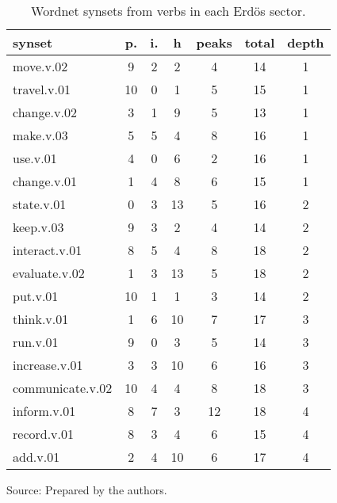 \begin{table}[h!]
\begin{center}
\caption{Wordnet synsets from verbs in each Erd\"os sector.}
	\label{tab:wnvh}
\begin{tabular}{| l || c | c | c || c | c | c |}\hline
{\bf synset} & {\bf p.} & {\bf i.} & {\bf h} & {\bf peaks} & {\bf total} & {\bf depth} \\\hline\hline
move.v.02 & 9  & 2  & 2  & 4  & 14  & 1 \\
travel.v.01 & 10  & 0  & 1  & 5  & 15  & 1 \\
change.v.02 & 3  & 1  & 9  & 5  & 13  & 1 \\
make.v.03 & 5  & 5  & 4  & 8  & 16  & 1 \\
use.v.01 & 4  & 0  & 6  & 2  & 16  & 1 \\
change.v.01 & 1  & 4  & 8  & 6  & 15  & 1 \\\hline
state.v.01 & 0  & 3  & 13  & 5  & 16  & 2 \\
keep.v.03 & 9  & 3  & 2  & 4  & 14  & 2 \\
interact.v.01 & 8  & 5  & 4  & 8  & 18  & 2 \\
evaluate.v.02 & 1  & 3  & 13  & 5  & 18  & 2 \\
put.v.01 & 10  & 1  & 1  & 3  & 14  & 2 \\\hline
think.v.01 & 1  & 6  & 10  & 7  & 17  & 3 \\
run.v.01 & 9  & 0  & 3  & 5  & 14  & 3 \\
increase.v.01 & 3  & 3  & 10  & 6  & 16  & 3 \\
communicate.v.02 & 10  & 4  & 4  & 8  & 18  & 3 \\\hline
inform.v.01 & 8  & 7  & 3  & 12  & 18  & 4 \\
record.v.01 & 8  & 3  & 4  & 6  & 15  & 4 \\
add.v.01 & 2  & 4  & 10  & 6  & 17  & 4 \\\hline
\end{tabular}
\begin{flushleft}
		Source: Prepared by the authors.\
\end{flushleft}
\end{center}
\end{table}
